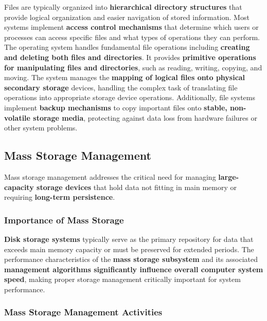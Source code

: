 Files are typically organized into \textbf{hierarchical directory structures} that provide logical organization and easier navigation of stored information. Most systems implement \textbf{access control mechanisms} that determine which users or processes can access specific files and what types of operations they can perform.
The operating system handles fundamental file operations including \textbf{creating and deleting both files and directories}. It provides \textbf{primitive operations for manipulating files and directories}, such as reading, writing, copying, and moving. The system manages the \textbf{mapping of logical files onto physical secondary storage} devices, handling the complex task of translating file operations into appropriate storage device operations.
Additionally, file systems implement \textbf{backup mechanisms} to copy important files onto \textbf{stable, non-volatile storage media}, protecting against data loss from hardware failures or other system problems.


\subsection{Mass Storage Management}

Mass storage management addresses the critical need for managing \textbf{large-capacity storage devices} that hold data not fitting in main memory or requiring \textbf{long-term persistence}.


\subsubsection{Importance of Mass Storage}

\textbf{Disk storage systems} typically serve as the primary repository for data that exceeds main memory capacity or must be preserved for extended periods. The performance characteristics of the \textbf{mass storage subsystem} and its associated \textbf{management algorithms significantly influence overall computer system speed}, making proper storage management critically important for system performance.


\subsubsection{Mass Storage Management Activities}

